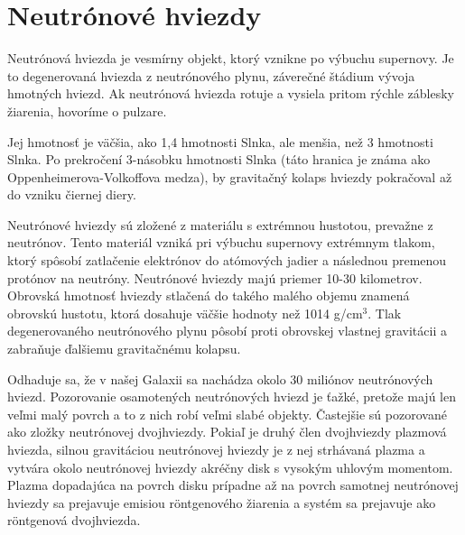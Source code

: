 \documentclass[../../main.tex]{subfiles}
\begin{document}
\section{Neutrónové hviezdy}

Neutrónová hviezda je vesmírny objekt, ktorý vznikne po výbuchu supernovy. Je to degenerovaná hviezda z neutrónového plynu, záverečné štádium vývoja hmotných hviezd. Ak neutrónová hviezda rotuje a vysiela pritom rýchle záblesky žiarenia, hovoríme o pulzare.

Jej hmotnosť je väčšia, ako 1,4 hmotnosti Slnka, ale menšia, než 3 hmotnosti Slnka. Po prekročení 3-násobku hmotnosti Slnka (táto hranica je známa ako Oppenheimerova-Volkoffova medza), by gravitačný kolaps hviezdy pokračoval až do vzniku čiernej diery.

Neutrónové hviezdy sú zložené z materiálu s extrémnou hustotou, prevažne z neutrónov. Tento materiál vzniká pri výbuchu supernovy extrémnym tlakom, ktorý spôsobí zatlačenie elektrónov do atómových jadier a následnou premenou protónov na neutróny. Neutrónové hviezdy majú priemer 10-30 kilometrov. Obrovská hmotnosť hviezdy stlačená do takého malého objemu znamená obrovskú hustotu, ktorá dosahuje väčšie hodnoty než 1014 g/cm$^3$. Tlak degenerovaného neutrónového plynu pôsobí proti obrovskej vlastnej gravitácii a zabraňuje ďalšiemu gravitačnému kolapsu.

Odhaduje sa, že v našej Galaxii sa nachádza okolo 30 miliónov neutrónových hviezd. Pozorovanie osamotených neutrónových hviezd je ťažké, pretože majú len veľmi malý povrch a to z nich robí veľmi slabé objekty. Častejšie sú pozorované ako zložky neutrónovej dvojhviezdy. Pokiaľ je druhý člen dvojhviezdy plazmová hviezda, silnou gravitáciou neutrónovej hviezdy je z nej strhávaná plazma a vytvára okolo neutrónovej hviezdy akréčny disk s vysokým uhlovým momentom. Plazma dopadajúca na povrch disku prípadne až na povrch samotnej neutrónovej hviezdy sa prejavuje emisiou röntgenového žiarenia a systém sa prejavuje ako röntgenová dvojhviezda.
\end{document}
